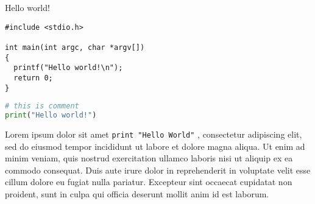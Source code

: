 \documentclass[a4paper]{article}
\begin{document}
Hello world!

\begin{verbatim}
#include <stdio.h>

int main(int argc, char *argv[])
{
  printf("Hello world!\n");
  return 0;
}
\end{verbatim}

\begin{lstlisting}[language=Python]
# this is comment
print("Hello world!")
\end{lstlisting}



Lorem ipsum dolor sit amet \lstinline{print "Hello World"} , consectetur
adipiscing elit, sed do eiusmod tempor incididunt ut labore et dolore magna
aliqua. Ut enim ad minim veniam, quis nostrud exercitation ullamco laboris nisi
ut aliquip ex ea commodo consequat. Duis aute irure dolor in reprehenderit in
voluptate velit esse cillum dolore eu fugiat nulla pariatur. Excepteur sint
occaecat cupidatat non proident, sunt in culpa qui officia deserunt mollit anim
id est laborum.
\end{document}
